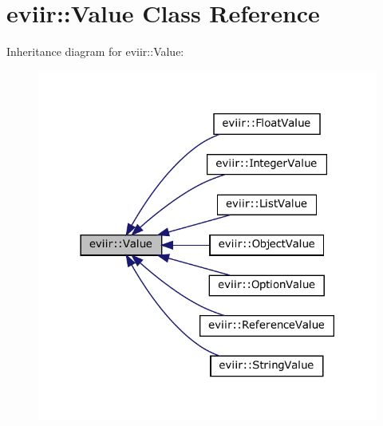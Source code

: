 \hypertarget{classeviir_1_1Value}{}\section{eviir\+:\+:Value Class Reference}
\label{classeviir_1_1Value}


Inheritance diagram for eviir\+:\+:Value\+:\nopagebreak
\begin{figure}[H]
\begin{center}
\leavevmode
\includegraphics[width=318pt]{classeviir_1_1Value__inherit__graph}
\end{center}
\end{figure}
